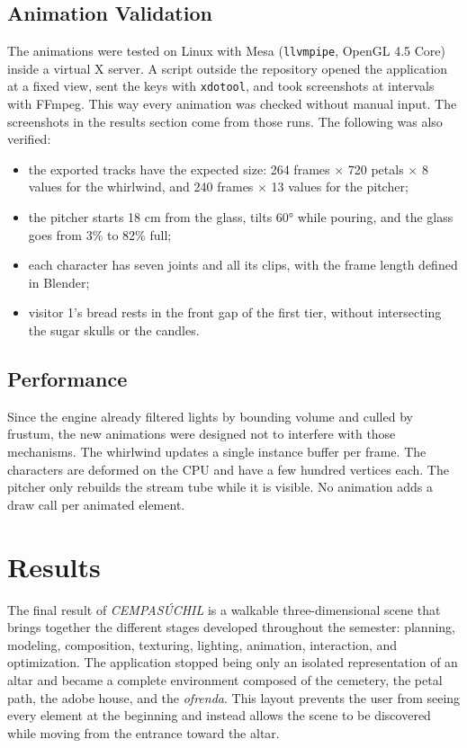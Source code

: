 \documentclass[letter,12pt]{article}
\begin{document}
	\subsection{Animation Validation}
	The animations were tested on Linux with Mesa (\texttt{llvmpipe}, OpenGL 4.5 Core) inside a virtual X server. A script outside the repository opened the application at a fixed view, sent the keys with \texttt{xdotool}, and took screenshots at intervals with FFmpeg. This way every animation was checked without manual input. The screenshots in the results section come from those runs. The following was also verified:
	\begin{itemize}[leftmargin=*]
		\item the exported tracks have the expected size: 264 frames $\times$ 720 petals $\times$ 8 values for the whirlwind, and 240 frames $\times$ 13 values for the pitcher;
		\item the pitcher starts 18 cm from the glass, tilts 60° while pouring, and the glass goes from 3\% to 82\% full;
		\item each character has seven joints and all its clips, with the frame length defined in Blender;
		\item visitor 1's bread rests in the front gap of the first tier, without intersecting the sugar skulls or the candles.
	\end{itemize}

	\subsection{Performance}
	Since the engine already filtered lights by bounding volume and culled by frustum, the new animations were designed not to interfere with those mechanisms. The whirlwind updates a single instance buffer per frame. The characters are deformed on the CPU and have a few hundred vertices each. The pitcher only rebuilds the stream tube while it is visible. No animation adds a draw call per animated element.

	\section{Results}

	The final result of \textit{CEMPASÚCHIL} is a walkable three-dimensional scene that brings together the different stages developed throughout the semester: planning, modeling, composition, texturing, lighting, animation, interaction, and optimization. The application stopped being only an isolated representation of an altar and became a complete environment composed of the cemetery, the petal path, the adobe house, and the \textit{ofrenda}. This layout prevents the user from seeing every element at the beginning and instead allows the scene to be discovered while moving from the entrance toward the altar.
\end{document}
